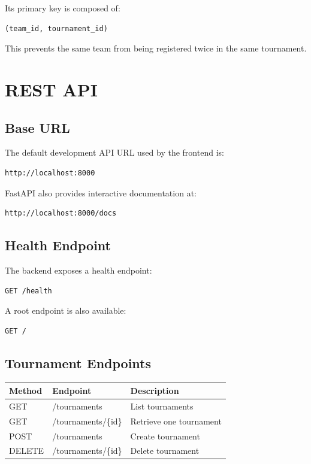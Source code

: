 \documentclass[12pt,a4paper]{article}
\begin{document}
Its primary key is composed of:

\begin{lstlisting}
(team_id, tournament_id)
\end{lstlisting}

This prevents the same team from being registered twice in the same
tournament.


\section{REST API}

\subsection{Base URL}

The default development API URL used by the frontend is:

\begin{lstlisting}
http://localhost:8000
\end{lstlisting}

FastAPI also provides interactive documentation at:

\begin{lstlisting}
http://localhost:8000/docs
\end{lstlisting}

\subsection{Health Endpoint}

The backend exposes a health endpoint:

\begin{lstlisting}
GET /health
\end{lstlisting}

A root endpoint is also available:

\begin{lstlisting}
GET /
\end{lstlisting}

\subsection{Tournament Endpoints}

\begin{longtable}{lll}
\toprule
\textbf{Method} & \textbf{Endpoint} & \textbf{Description}\\
\midrule
\endhead
GET & /tournaments & List tournaments\\
GET & /tournaments/\{id\} & Retrieve one tournament\\
POST & /tournaments & Create tournament\\
DELETE & /tournaments/\{id\} & Delete tournament\\
\bottomrule
\end{longtable}
\end{document}
